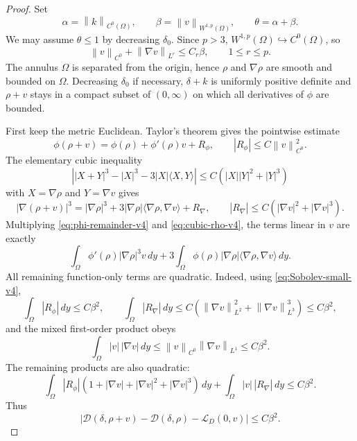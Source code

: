 \documentclass[10pt,a4paper]{amsart}
\newcommand{\Dfun}{\mathscr D}
\newcommand{\LD}{\mathcal L_D}
\newcommand{\ip}[2]{\langle #1,#2\rangle}
\newcommand{\norm}[1]{\left\lVert #1\right\rVert}
\newcommand{\rhoE}{\rho}
\begin{document}
\begin{proof}
Set
$$
        \alpha=\norm{k}_{C^0(\Omega)},\qquad
        \beta=\norm{v}_{W^{1,p}(\Omega)},\qquad
        \theta=\alpha+\beta.
$$
We may assume $\theta\le1$ by decreasing $\delta_0$.  Since $p>3$,
$W^{1,p}(\Omega)\hookrightarrow C^0(\Omega)$, so
\begin{equation}\label{eq:Sobolev-small-v4}
        \norm{v}_{C^0}+\norm{\nabla v}_{L^r}
        \le C_r\beta,
        \qquad 1\le r\le p.
\end{equation}
The annulus $\Omega$ is separated from the origin, hence $\rhoE$ and $\nabla\rhoE$ are smooth and bounded on $\Omega$.  Decreasing $\delta_0$ if necessary, $\delta+k$ is uniformly positive definite and $\rhoE+v$ stays in a compact subset of $(0,\infty)$ on which all derivatives of $\phi$ are bounded.

First keep the metric Euclidean.  Taylor's theorem gives the pointwise estimate
\begin{equation}\label{eq:phi-remainder-v4}
        \phi(\rhoE+v)=\phi(\rhoE)+\phi'(\rhoE)v+R_\phi,
        \qquad |R_\phi|\le C\norm{v}_{C^0}^2.
\end{equation}
The elementary cubic inequality
\begin{equation}\label{eq:cubic-estimate-v4}
        \left||X+Y|^3-|X|^3-3|X|\ip{X}{Y}\right|
        \le C(|X||Y|^2+|Y|^3)
\end{equation}
with $X=\nabla\rhoE$ and $Y=\nabla v$ gives
\begin{equation}\label{eq:cubic-rho-v4}
        |\nabla(\rhoE+v)|^3
        =|\nabla\rhoE|^3
        +3|\nabla\rhoE|\ip{\nabla\rhoE}{\nabla v}
        +R_\nabla,
        \qquad
        |R_\nabla|\le C(|\nabla v|^2+|\nabla v|^3).
\end{equation}
Multiplying \eqref{eq:phi-remainder-v4} and \eqref{eq:cubic-rho-v4}, the terms linear in $v$ are exactly
$$
        \int_\Omega \phi'(\rhoE)|\nabla\rhoE|^3v\,dy
        +3\int_\Omega \phi(\rhoE)|\nabla\rhoE|
        \ip{\nabla\rhoE}{\nabla v}\,dy.
$$
All remaining function-only terms are quadratic.  Indeed, using \eqref{eq:Sobolev-small-v4},
$$
        \int_\Omega |R_\phi|\,dy\le C\beta^2,
        \qquad
        \int_\Omega |R_\nabla|\,dy
        \le C(\norm{\nabla v}_{L^2}^2+\norm{\nabla v}_{L^3}^3)
        \le C\beta^2,
$$
and the mixed first-order product obeys
$$
        \int_\Omega |v|\,|\nabla v|\,dy
        \le \norm{v}_{C^0}\norm{\nabla v}_{L^1}
        \le C\beta^2.
$$
The remaining products are also quadratic:
$$
        \int_\Omega |R_\phi|(1+|\nabla v|+|\nabla v|^2+|\nabla v|^3)\,dy
        +\int_\Omega |v|\,|R_\nabla|\,dy
        \le C\beta^2.
$$
Thus
\begin{equation}\label{eq:function-only-quadratic-v4}
        \left|\Dfun(\delta,\rhoE+v)-\Dfun(\delta,\rhoE)-\LD(0,v)\right|
        \le C\beta^2.
\end{equation}


\end{proof}
\end{document}
